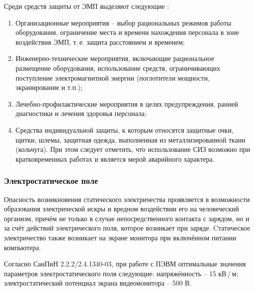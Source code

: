 Среди средств защиты от ЭМП выделяют следующие \cite{Bzd2007}:
\begin{enumerate}
[leftmargin=0pt,itemindent=\parindent+\labelwidth+\labelsep]
    \item Организационные мероприятия -- выбор рациональных режимов работы оборудования, ограничение места и времени нахождения персонала в зоне воздействия ЭМП, т.\,е. защита расстоянием и временем;
    \item Инженерно-технические мероприятия, включающие рациональное размещение оборудования, использование средств, ограничивающих поступление электромагнитной энергии (поглотители мощности, экранирование и т.п.);
    \item Лечебно-профилактические мероприятия в целях предупреждения, ранней диагностики и лечения здоровья персонала;
    \item Средства индивидуальной защиты, к которым относятся защитные очки, щитки, шлемы, защитная одежда, выполненная из металлизированной ткани (кольчуга). При этом следует отметить, что использование СИЗ возможно при кратковременных работах и является мерой аварийного характера.
\end{enumerate}


\subsubsection{Электростатическое поле}

Опасность возникновения статического электричества проявляется в возможности образования электрической искры и вредном воздействии его на человеческий организм, причём не только в случае непосредственного контакта с зарядом, но и за счёт действий электрического поля, которое возникает при заряде. 
Cтатическое электричество также возникает на экране монитора при включённом питании компьютера. 

Согласно СанПиН 2.2.2/2.4.1340-03, при работе с ПЭВМ оптимальные значения параметров электростатического поля следующие: напряжённость -- 15 кВ\,/\,м; электростатический потенциал экрана видеомонитора -- 500 В.

